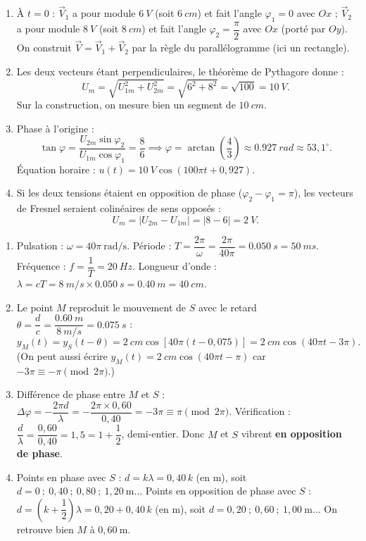\documentclass[11pt]{article}
\begin{document}
\begin{corrige}
\begin{enumerate}
\item À $t = 0$ : $\vec{V}_1$ a pour module $\SI{6}{V}$ (soit $\SI{6}{cm}$) et fait l'angle $\varphi_1 = 0$ avec $Ox$ ; $\vec{V}_2$ a pour module $\SI{8}{V}$ (soit $\SI{8}{cm}$) et fait l'angle $\varphi_2 = \dfrac{\pi}{2}$ avec $Ox$ (porté par $Oy$). On construit $\vec{V} = \vec{V}_1 + \vec{V}_2$ par la règle du parallélogramme (ici un rectangle).
\item Les deux vecteurs étant perpendiculaires, le théorème de Pythagore donne :
\[ U_m = \sqrt{U_{1m}^2 + U_{2m}^2} = \sqrt{6^2 + 8^2} = \sqrt{100} = \SI{10}{V}. \]
Sur la construction, on mesure bien un segment de $\SI{10}{cm}$.
\item Phase à l'origine :
\[ \tan\varphi = \frac{U_{2m}\sin\varphi_2}{U_{1m}\cos\varphi_1} = \frac{8}{6} \implies \varphi = \arctan\left(\frac{4}{3}\right) \approx \SI{0,927}{rad} \approx 53,1^\circ. \]
Équation horaire : $u(t) = \SI{10}{V}\cos\left(100\pi t + 0,927\right)$.
\item Si les deux tensions étaient en opposition de phase ($\varphi_2 - \varphi_1 = \pi$), les vecteurs de Fresnel seraient colinéaires de sens opposés :
\[ U_m = |U_{2m} - U_{1m}| = |8 - 6| = \SI{2}{V}. \]
\end{enumerate}
\end{corrige}

\begin{corrige}
\begin{enumerate}
\item Pulsation : $\omega = 40\pi\ \text{rad/s}$. Période : $T = \dfrac{2\pi}{\omega} = \dfrac{2\pi}{40\pi} = \SI{0,050}{s} = \SI{50}{ms}$. Fréquence : $f = \dfrac{1}{T} = \SI{20}{Hz}$. Longueur d'onde : $\lambda = cT = \SI{8}{m/s} \times \SI{0,050}{s} = \SI{0,40}{m} = \SI{40}{cm}$.
\item Le point $M$ reproduit le mouvement de $S$ avec le retard $\theta = \dfrac{d}{c} = \dfrac{\SI{0,60}{m}}{\SI{8}{m/s}} = \SI{0,075}{s}$ :
\[ y_M(t) = y_S(t - \theta) = \SI{2}{cm}\cos\left[40\pi\left(t - 0,075\right)\right] = \SI{2}{cm}\cos(40\pi t - 3\pi). \]
(On peut aussi écrire $y_M(t) = \SI{2}{cm}\cos(40\pi t - \pi)$ car $-3\pi \equiv -\pi \pmod{2\pi}$.)
\item Différence de phase entre $M$ et $S$ : $\Delta\varphi = -\dfrac{2\pi d}{\lambda} = -\dfrac{2\pi \times 0,60}{0,40} = -3\pi \equiv \pi \pmod{2\pi}$.
Vérification : $\dfrac{d}{\lambda} = \dfrac{0,60}{0,40} = 1,5 = 1 + \dfrac{1}{2}$, demi-entier. Donc $M$ et $S$ vibrent \textbf{en opposition de phase}.
\item Points en phase avec $S$ : $d = k\lambda = 0,40\,k$ (en m), soit $d = 0\ ;\ 0,40\ ;\ 0,80\ ;\ 1,20\ \text{m}\ldots$
Points en opposition de phase avec $S$ : $d = \left(k+\dfrac{1}{2}\right)\lambda = 0,20 + 0,40\,k$ (en m), soit $d = 0,20\ ;\ 0,60\ ;\ 1,00\ \text{m}\ldots$ On retrouve bien $M$ à $0,60\ \text{m}$.
\end{enumerate}
\end{corrige}
\end{document}
